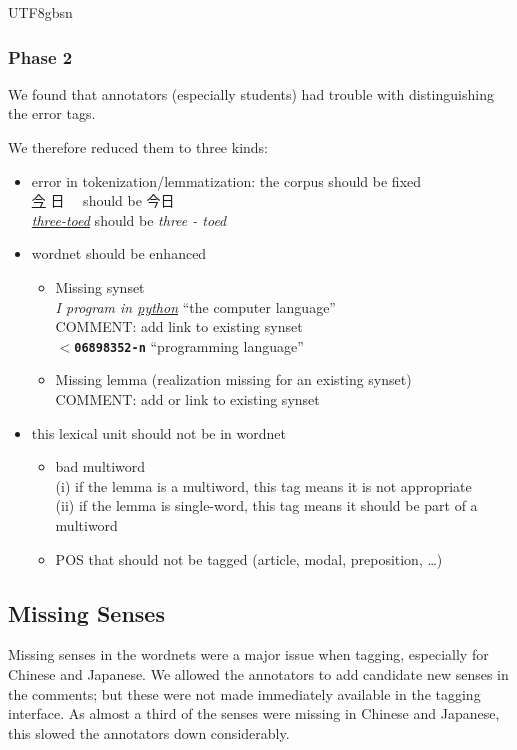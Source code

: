 \documentclass[12pt]{book} %
\newcommand{\of}[1]{\textbf{\texttt{#1}}}
\newcommand{\ul}{\uline}
\begin{document}
\begin{CJK}{UTF8}{gbsn}
\subsubsection{Phase 2}

We found that annotators (especially students) had trouble with
distinguishing the error tags.  %

We therefore reduced them to three kinds: 


\begin{itemize}
\item [\textbf{e}] error in tokenization/lemmatization: 
  the corpus should be fixed
  \\ \ul{今} 日　 should be 今日
  \\ \textit{\ul{three-toed}} should be \textit{three - toed}
\item [\textbf{w}] wordnet should be enhanced
  \begin{itemize}
  \item Missing synset
    \\ \textit{I program in \ul{python}} ``the computer language''
    \\ COMMENT: add link to existing synset
    \\ $<$\of{06898352-n} ``programming language''
  \item Missing lemma (realization missing for an existing synset)
    \\ COMMENT: add or link to existing synset
  \end{itemize}
\item [\textbf{x}] this lexical unit should not be in wordnet
  \begin{itemize}
  \item bad multiword \\ (i) if the lemma is a multiword,
    this tag means it is not appropriate \\ (ii) if the lemma is
    single-word, this tag means it should be part of a multiword
  \item  POS that should not be tagged (article, modal,
    preposition, \ldots{})
  \end{itemize}
\end{itemize}


\subsection{Missing Senses}

Missing senses in the wordnets were a major issue when tagging,
especially for Chinese and Japanese.  We allowed the annotators to add
candidate new senses in the comments; but these were not made
immediately available in the tagging interface. As almost a third of
the senses were missing in Chinese and Japanese, this slowed the
annotators down considerably.


\end{CJK}
\end{document}

